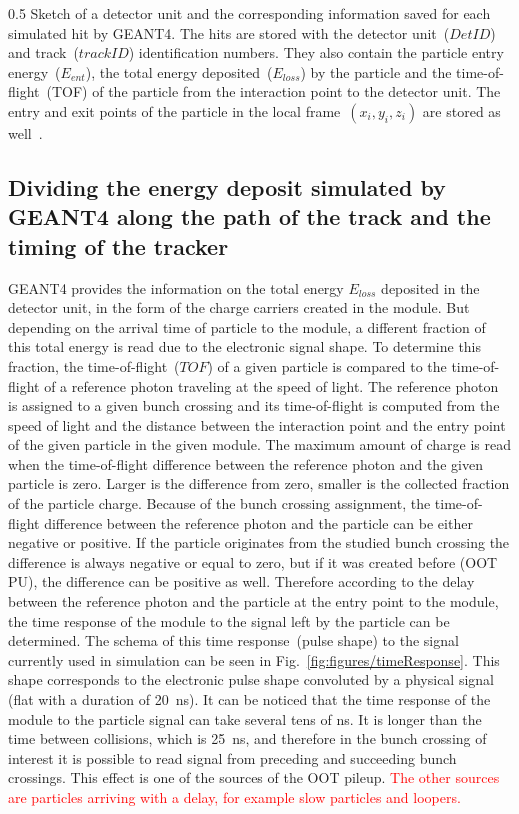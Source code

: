                  {0.5}       %
                 { Sketch of a detector unit and the corresponding information saved for each simulated hit by GEANT4. The hits are stored with the detector unit~($DetID$) and track~($trackID$) identification numbers. They also contain the particle entry energy~($E_{ent}$), the total energy deposited~($E_{loss}$) by the particle and the time-of-flight~(TOF) of the particle from the interaction point to the detector unit. The entry and exit points of the particle in the local frame~$(x_{i},y_{i},z_{i})$ are stored as well~\cite{website:simuBasics}. }

\subsection{Dividing the energy deposit simulated by GEANT4 along the path of the track and the timing of the tracker~\label{sec:divide}}

GEANT4 provides the information on the total energy $E_{loss}$ deposited in the detector unit, in the form of the charge carriers created in the module. But depending on the arrival time of particle to the module, a different fraction of this total energy is read due to the electronic signal shape. To determine this fraction, the time-of-flight~($TOF$) of a given particle is compared to the time-of-flight of a reference photon traveling at the speed of light. The reference photon is assigned to a given bunch crossing and its time-of-flight is computed from the speed of light and the distance between the interaction point and the entry point of the given particle in the given module. The maximum amount of charge is read when the time-of-flight difference between the reference photon and the given particle is zero. Larger is the difference from zero, smaller is the collected fraction of the particle charge. Because of the bunch crossing assignment, the time-of-flight difference between the reference photon and the particle can be either negative or positive. If the particle originates from the studied bunch crossing the difference is always negative or equal to zero, but if it was created before (OOT PU), the difference can be positive as well. Therefore according to the delay between the reference photon and the particle at the entry point to the module, the time response of the module to the signal left by the particle can be determined. The schema of this time response~(pulse shape) to the signal currently used in simulation can be seen in Fig.~\ref{fig:figures/timeResponse}. This shape corresponds to the electronic pulse shape convoluted by a physical signal (flat with a duration  of 20~ns). It can be noticed that the time response of the module to the particle signal can take several tens of ns. It is longer than the time between collisions, which is 25~ns, and therefore in the bunch crossing of interest it is possible to read signal from preceding and succeeding bunch crossings. This effect is one of the sources of the OOT pileup. \textcolor{red}{The other sources are particles arriving with a delay, for example slow particles and loopers.}

